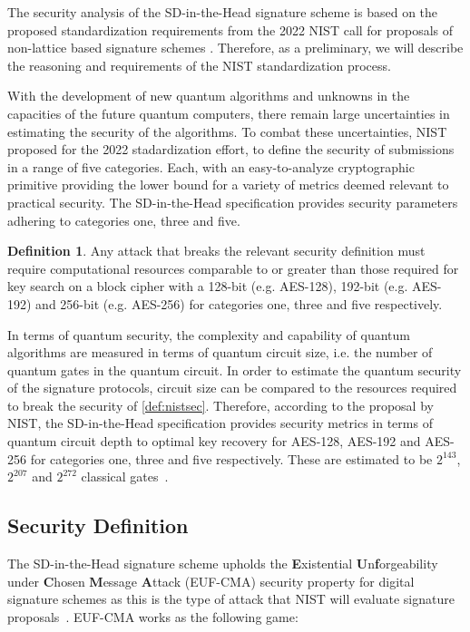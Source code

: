 \documentclass[twoside,11pt,openright]{report}
\theoremstyle{definition}
\newtheorem{definition}{Definition}[section]
\theoremstyle{plain}
\begin{document}
The security analysis of the SD-in-the-Head signature scheme is based on the proposed standardization requirements from the 2022 NIST call for proposals of non-lattice based signature schemes \cite{nistcall}. Therefore, as a preliminary, we will describe the reasoning and requirements of the NIST standardization process.

With the development of new quantum algorithms and unknowns in the capacities of the future quantum computers, there remain large uncertainties in estimating the security of the algorithms. To combat these uncertainties, NIST proposed for the 2022 stadardization effort, to define the security of submissions in a range of five categories. Each, with an easy-to-analyze cryptographic primitive providing the lower bound for a variety of metrics deemed relevant to practical security. The SD-in-the-Head specification provides security parameters adhering to categories one, three and five.

\begin{definition}
  \label{def:nistsec}
  Any attack that breaks the relevant security definition must require computational resources comparable to or greater than those required for key search on a block cipher with a 128-bit (e.g. AES-128), 192-bit (e.g. AES-192) and 256-bit (e.g. AES-256) for categories one, three and five respectively.
\end{definition}

In terms of quantum security, the complexity and capability of quantum algorithms are measured in terms of quantum circuit size, i.e. the number of quantum gates in the quantum circuit. In order to estimate the quantum security of the signature protocols, circuit size can be compared to the resources required to break the security of \autoref{def:nistsec}. Therefore,
according to the proposal by NIST, the SD-in-the-Head specification provides security metrics in terms of quantum circuit depth to optimal key recovery for AES-128, AES-192 and AES-256 for categories one, three and five respectively. These are estimated to be $2^{143}$, $2^{207}$ and $2^{272}$ classical gates~\cite{nistcall}.

\subsection{Security Definition}

The SD-in-the-Head signature scheme upholds the \textbf{E}xistential \textbf{U}n\textbf{f}orgeability under \textbf{C}hosen \textbf{M}essage \textbf{A}ttack (EUF-CMA) security property for digital signature schemes as this is the type of attack that NIST will evaluate signature proposals~\cite{nistcall,aguilarsyndrome11}. EUF-CMA works as the following game:
\end{document}
